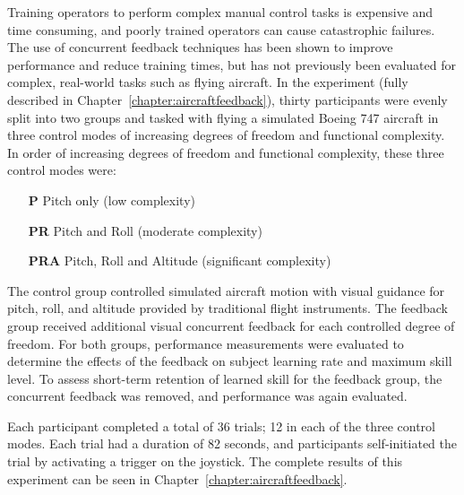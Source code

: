 Training operators to perform complex manual control tasks is expensive and time consuming, and poorly trained operators can cause catastrophic failures.
The use of concurrent feedback techniques has been shown to improve performance and reduce training times, but has not previously been evaluated for complex, real-world tasks such as flying aircraft.
In the experiment (fully described in Chapter~\ref{chapter:aircraftfeedback}), thirty participants were evenly split into two groups and tasked with flying a simulated Boeing 747 aircraft in three control modes of increasing degrees of freedom and functional complexity.
In order of increasing degrees of freedom and functional complexity, these three control modes were:
\begin{itemize}
    \item[\textbf{P}] Pitch only (low complexity)
    \item[\textbf{PR}] Pitch and Roll (moderate complexity)
    \item[\textbf{PRA}] Pitch, Roll and Altitude (significant complexity)
\end{itemize}
The control group controlled simulated aircraft motion with visual guidance for pitch, roll, and altitude provided by traditional flight instruments.
The feedback group received additional visual concurrent feedback for each controlled degree of freedom.
For both groups, performance measurements were evaluated to determine the effects of the feedback on subject learning rate and maximum skill level.
To assess short-term retention of learned skill for the feedback group, the concurrent feedback was removed, and performance was again evaluated.

Each participant completed a total of 36 trials; 12 in each of the three control modes.
Each trial had a duration of 82 seconds, and participants self-initiated the trial by activating a trigger on the joystick.
The complete results of this experiment can be seen in Chapter~\ref{chapter:aircraftfeedback}.

